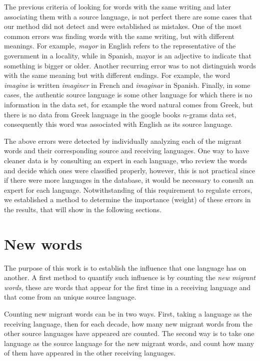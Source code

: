\documentclass[10pt,letterpaper]{article} %
\begin{document}
The previous criteria of looking for words with the same writing and later
associating them with a source language, is not perfect there are some cases
that our method did not detect and were established as mistakes. One of the
most common errors was finding words with the same writing, but with different
meanings. For example,  \textit{mayor} in English refers to the representative
of the government in a locality, while in Spanish, mayor is an
adjective to indicate that something is bigger or older.  Another recurring
error was to not distinguish words with the same meaning but with different
endings. For example, the word \textit{imagine} is written \textit{imaginer} in
French and \textit{imaginar} in Spanish.  Finally, in some cases, the authentic
source language is some other language for which there is no information in the
data set, for example the word  natural comes from Greek, but there is no data
from Greek language in the google books $n$-grams data set, consequently this
word was associated with English as its source language.

The above errors were detected by individually analyzing each of the migrant
words and their corresponding source and receiving languages. One way to have
cleaner data is by consulting an expert in each language, who review the words
and decide which ones were classified properly, however, this is not practical
since if there were more languages in the database, it would be necessary to
consult an expert for each language. Notwithstanding of this requirement to
regulate errors, we established a method to determine the importance (weight)
of these errors in the results, that will show in the following sections. 
	\section*{New words} %
	 
	The purpose of this work is to establish the influence that one language has on another. A first method to quantify such influence is by counting the \textit{new migrant words}, these are words that appear for the first time in a receiving language and that come from an unique  source language.
	
	Counting new migrant words can be in two ways. First, taking a language as the receiving language, then for each decade, how many new migrant words from the other source languages have appeared are counted. The second way is to take one language as the source language for the new migrant words, and count how many of them have appeared in the other receiving languages.
	
\end{document}
